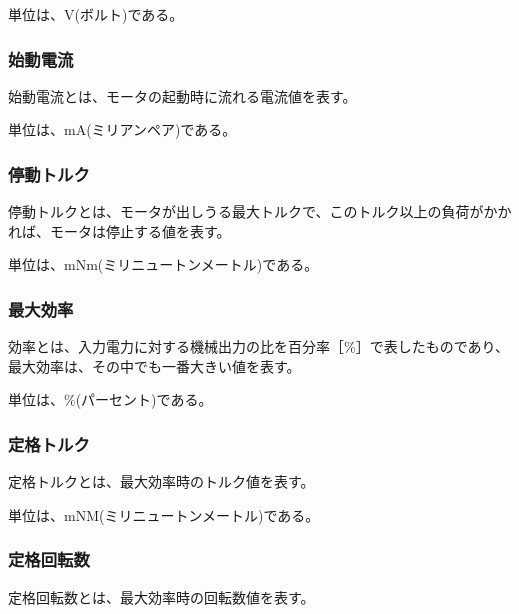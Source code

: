 単位は、V(ボルト)である。
\subsubsection{始動電流}\label{sub:sub:sidouden}
始動電流とは、モータの起動時に流れる電流値を表す。

単位は、mA(ミリアンペア)である。
\subsubsection{停動トルク}\label{sub:sub:teidoutoruku}
停動トルクとは、モータが出しうる最大トルクで、このトルク以上の負荷がかかれば、モータは停止する値を表す。

単位は、mNm(ミリニュートンメートル)である。
\subsubsection{最大効率}\label{sub:sub:saidaikouritu}
効率とは、入力電力に対する機械出力の比を百分率［\%］で表したものであり、最大効率は、その中でも一番大きい値を表す。

単位は、\%(パーセント)である。
\subsubsection{定格トルク}\label{sub:sub:teikakutoruku}
定格トルクとは、最大効率時のトルク値を表す。

単位は、mNM(ミリニュートンメートル)である。
\subsubsection{定格回転数}\label{sub:sub:teikakukaiten}
定格回転数とは、最大効率時の回転数値を表す。

